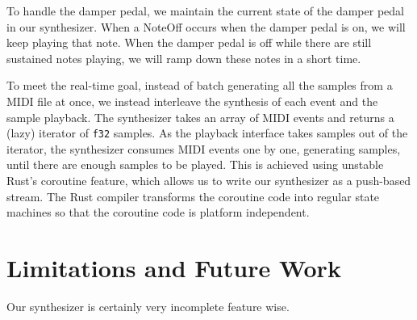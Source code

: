 \documentclass{article}
\begin{document}
To handle the damper pedal, we maintain the current state of the damper
pedal in our synthesizer. When a NoteOff occurs when the damper pedal
is on, we will keep playing that note. When the damper pedal is off while
there are still sustained notes playing, we will ramp down these notes in
a short time.

To meet the real-time goal, instead of batch generating all the samples
from a MIDI file at once, we instead interleave the synthesis of each event
and the sample playback. The synthesizer takes an array of MIDI events
and returns a (lazy) iterator of \texttt{f32} samples. As the playback
interface takes samples out of the iterator, the synthesizer consumes MIDI
events one by one, generating samples, until there are enough
samples to be played. This is achieved using unstable Rust's coroutine
feature, which allows us to write our synthesizer as a push-based stream.
The Rust compiler transforms the coroutine code into regular state machines
so that the coroutine code is platform independent.

\section{Limitations and Future Work}

Our synthesizer is certainly very incomplete feature wise.
\end{document}
